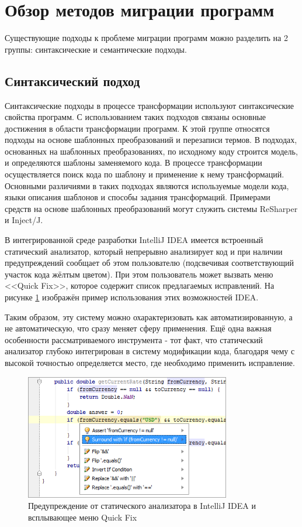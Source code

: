 \section{Обзор методов миграции программ}
Существующие подходы к проблеме миграции программ можно разделить на 2 группы: синтаксические и семантические подходы.

\subsection{Синтаксический подход}
Синтаксические подходы в процессе трансформации используют синтаксические свойства программ. С использованием таких подходов связаны основные достижения в области трансформации программ. К этой группе относятся подходы на основе шаблонных преобразований и перезаписи термов.
В подходах, основанных на шаблонных преобразованиях, по исходному коду строится модель, и определяются шаблоны заменяемого кода. В процессе трансформации осуществляется поиск кода по шаблону и применение к нему трансформаций. Основными различиями в таких подходах являются используемые модели кода, языки описания шаблонов и способы задания трансформаций. Примерами средств на основе шаблонных преобразований могут служить системы ReSharper и Inject/J.

В интегрированной среде разработки IntelliJ IDEA имеется встроенный статический анализатор\cite{ideaStatic}, который непрерывно анализирует код и при наличии предупреждений сообщает об этом пользователю (подсвечивая соответствующий участок кода жёлтым цветом). При этом пользователь может вызвать меню <<Quick Fix>>, которое содержит список предлагаемых исправлений. На рисунке \ref{fig:idea} изображён пример использования этих возможностей IDEA.

Таким образом, эту систему можно охарактеризовать как автоматизированную, а не автоматическую, что сразу меняет сферу применения. Ещё одна важная особенности рассматриваемого инструмента - тот факт, что статический анализатор глубоко интегрирован в систему модификации кода, благодаря чему с высокой точностью определяется место, где необходимо применить исправление.

\begin{figure}[htbp]
	\centering
	\includegraphics[width=0.8\textwidth]{code_analysis_bugs.png}
	\caption{Предупреждение от статического анализатора в IntelliJ IDEA и всплывающее меню Quick Fix}%
	\label{fig:idea}
\end{figure}

